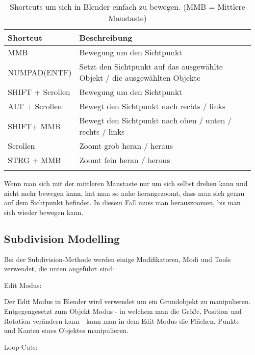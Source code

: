 \begin{longtable}{|p{4cm}|p{9.6cm}|}
    \hline
    \endfirsthead
    \textbf{Shortcut} & \textbf{Beschreibung}\\
    \hline
    \endhead

    MMB & Bewegung um den Sichtpunkt \\
    \hline
    NUMPAD(ENTF) & Setzt den Sichtpunkt auf das ausgewählte Objekt / die ausgewählten Objekte \\
    \hline
    SHIFT + Scrollen & Bewegung um den Sichtpunkt \\
    \hline
    ALT + Scrollen & Bewegt den Sichtpunkt nach rechts / links \\
    \hline
    SHIFT+ MMB & Bewegt den Sichtpunkt nach oben / unten / rechts / links \\
    \hline
    Scrollen & Zoomt grob heran / heraus \\
    \hline
    STRG + MMB & Zoomt fein heran / heraus \\
    \hline

    \caption{Shortcuts um sich in Blender einfach zu bewegen. (MMB = Mittlere Maustaste)}
    \label{table:blender_movement}
\end{longtable}

Wenn man sich mit der mittleren Maustaste nur um sich selbst drehen kann und nicht mehr bewegen kann, hat man
so nahe herangezoomt, dass man sich genau auf dem Sichtpunkt befindet. In diesem Fall muss man herauszoomen, bis
man sich wieder bewegen kann.



\subsection{Subdivision Modelling}
\label{sec:subdivision}
Bei der Subdivision-Methode werden einige Modifikatoren, Modi und Tools verwendet, die unten angeführt sind:

Edit Modus\citep{blender:edit_mode}:

Der Edit Modus in Blender wird verwendet um ein Grundobjekt zu manipulieren. Entgegengesetzt zum Objekt Modus - in
welchem man die Größe, Position und Rotation verändern kann - kann man in dem Edit-Modus die Flächen, Punkte und Kanten
eines Objektes manipulieren.

Loop-Cuts\citep{blender:loop_cut_slide}:

